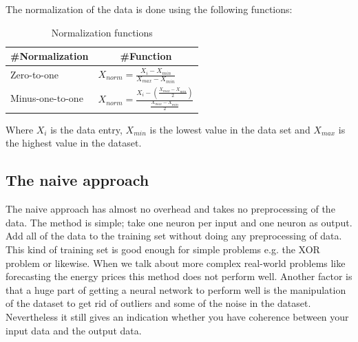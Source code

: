 The normalization of the data is done using the following functions:
\begin{table}[H]
\centering  %
\renewcommand{\arraystretch}{2}
\begin{tabular}{c c} %
 \#Normalization & \#Function \\ [0.5ex] %
\hline                  %
\multicolumn{1}{l}{Zero-to-one} & \multicolumn{1}{l}{$ X_{norm} = \frac{X_i - X_{min}}{X_{max} - X_{min}}$} \\
\multicolumn{1}{l}{Minus-one-to-one} & \multicolumn{1}{l}{$ X_{norm} = \frac{X_i - (\frac{X_{max} - X_{min}}{2})}{\frac{X_{max} - X_{min}}{2}}$} \\
[1ex]
\hline %
\end{tabular}
\caption{Normalization functions} %
\label{table:naiveTrainingApproach} %
\end{table}
Where $X_i$ is the data entry, $X_{min}$ is the lowest value in the data set and $X_{max}$ is the highest value in the dataset.

\subsection{The naive approach}
The naive approach has almost no overhead and takes no preprocessing of the data. The method is simple; take one neuron per input and one neuron as output. Add all of the data to the training set without doing any preprocessing of data. This kind of training set is good enough for simple problems e.g. the XOR problem or likewise. When we talk about more complex real-world problems like forecasting the energy prices this method does not perform well. Another factor is that a huge part of getting a neural network to perform well is the manipulation of the dataset to get rid of outliers and some of the noise in the dataset. Nevertheless it still gives an indication whether you have coherence between your input data and the output data.

